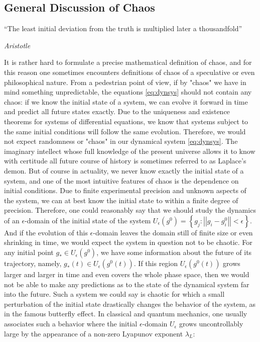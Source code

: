 \begin{subappendices}
\section{General Discussion of Chaos}

\label{appendix:chaos}

 \epigraph{ “The least initial deviation from the truth is multiplied later a thousandfold”}{{\it Aristotle} \cite{Aristotle}}

It is rather hard to formulate a precise mathematical definition of chaos, and for this reason one sometimes encounters definitions of chaos of a speculative or even philosophical nature. From a pedestrian point of view, if by "chaos" we have in mind something unpredictable, the equations \cref{eq:dynsys} should not contain any chaos: if we know the initial state of a system, we can evolve it forward in time and predict all future states exactly. Due to the uniqueness and existence theorems for systems of differential equations, we know that systems subject to the same initial conditions will follow the same evolution. Therefore, we would not expect randomness or "chaos" in our dynamical system \cref{eq:dynsys}. The imaginary intellect whose full knowledge of the present universe allows it to know with certitude all future course of history is sometimes referred to as Laplace's demon.  But of course in actuality, we never know exactly the initial state of a system, and one of the most intuitive features of chaos is the dependence on initial conditions.  Due to finite experimental precision and unknown aspects of the system, we can at best know the initial state to within a finite degree of precision. Therefore, one could reasonably say that we should study the dynamics of an $\epsilon$-domain of the initial state of the system $U_\epsilon(g^0) = \left\{g_j: \left|\left| g_i-g_i^0\right| \right| < \epsilon \right\}$. And if the evolution of this $\epsilon$-domain leaves the domain still of finite size or even shrinking in time, we would expect the system in question not to be chaotic. For any initial point $g_* \in U_\epsilon(g^0)$, we have some information about the future of its trajectory, namely, $g_*(t) \in U_\epsilon(g^0(t))$. If this region $U_\epsilon(g^0(t))$ grows larger and larger in time and even covers the whole phase space, then we would not be able to make any predictions as to the state of the dynamical system far into the future. Such a system we could say is chaotic for which a small perturbation of the initial state drastically changes the behavior of the system, as in the famous butterfly effect. In classical and quantum mechanics, one usually associates such a behavior where the initial $\epsilon$-domain $U_\epsilon$ grows uncontrollably large by the appearance of a non-zero Lyapunov exponent $\lambda_L$:

\end{subappendices}
